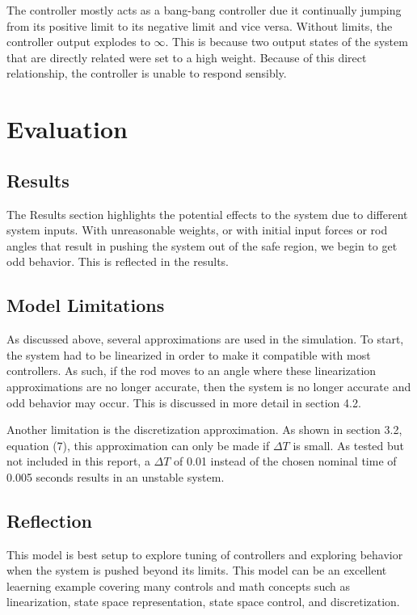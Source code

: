 \documentclass{article}
\begin{document}
    The controller mostly acts as a bang-bang controller due it continually jumping from its positive limit to its negative limit and vice versa. Without limits, the controller output explodes to $\infty$. This is because two output states of the system that are directly related were set to a high weight. Because of this direct relationship, the controller is unable to respond sensibly.
    

\section{Evaluation}

\subsection{Results}

The Results section highlights the potential effects to the system due to different system inputs. With unreasonable weights, or with initial input forces or rod angles that result in pushing the system out of the safe region, we begin to get odd behavior. This is reflected in the results. 

\subsection{Model Limitations}

As discussed above, several approximations are used in the simulation. To start, the system had to be linearized in order to make it compatible with most controllers. As such, if the rod moves to an angle where these linearization approximations are no longer accurate, then the system is no longer accurate and odd behavior may occur. This is discussed in more detail in section 4.2. 

Another limitation is the discretization approximation. As shown in section 3.2, equation (7), this approximation can only be made if $\Delta T$ is small. As tested but not included in this report, a $\Delta T$ of 0.01 instead of the chosen nominal time of 0.005 seconds results in an unstable system.

\subsection{Reflection}

This model is best setup to explore tuning of controllers and exploring behavior when the system is pushed beyond its limits. This model can be an excellent leaerning example covering many controls and math concepts such as linearization, state space representation, state space control, and discretization.
\end{document}
